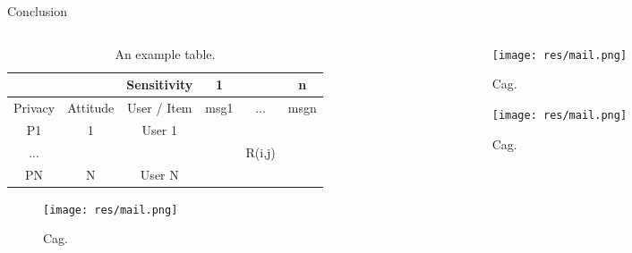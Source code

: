 \begin{frame}{Conclusion}

	\begin{columns}
	
		\begin{column}{0.5\textwidth}
		
			\begin{table}
				\begin{tabular}{c|c|a|c|c|c}	
													&				 	& Sensitivity 	&  1				&				&  n 		\\\hline
					Privacy 	& Attitude			& User / Item 	& msg1			& ... 			& msgn  		\\\hline
					P1								&  1	 				& User 1			& 				&				&			\\\hline
					...								& 					& 				& 				&	R(i,j)		&			\\\hline
					PN								&  N	 				& User N			& 				&				&	
		
				\end{tabular}
				\caption{\label{tab:widgets} An example table.}
			\end{table}		
		
			\begin{figure}
				\texttt{[image: res/mail.png]}
				\caption{\label{fig:g}Cag.}
			\end{figure}
			
		\end{column}
		
		\begin{column}{0.5\textwidth}

			\begin{figure}
				\texttt{[image: res/mail.png]}
				\caption{\label{fig:g}Cag.}
			\end{figure}
			
			\begin{figure}
				\texttt{[image: res/mail.png]}
				\caption{\label{fig:g}Cag.}
			\end{figure}

		\end{column}
	\end{columns}

	


\end{frame}

